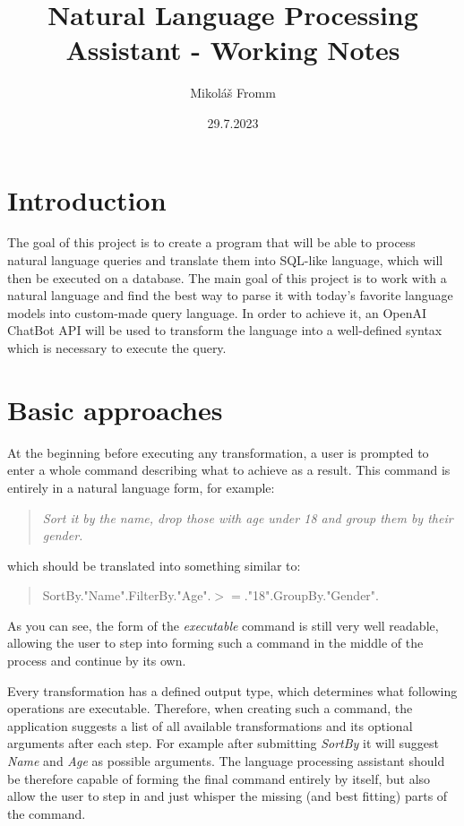 \documentclass[12pt]{article}
\title{Natural Language Processing Assistant - Working Notes}
\author{Mikoláš Fromm}
\date{29.7.2023}
\begin{document}
\maketitle

\section{Introduction}

The goal of this project is to create a program that will be able to process natural language queries and translate them into SQL-like language, which will then be executed on a database. The main goal of this project is to work with a natural language and find the best way to parse it with today's favorite language models into custom-made query language. In order to achieve it, an OpenAI ChatBot API will be used to transform the language into a well-defined syntax which is necessary to execute the query.


\section{Basic approaches}

At the beginning before executing any transformation, a user is prompted to enter a whole command describing what to achieve as a result. This command is entirely in a natural language form, for example: \begin{quotation}\textit{Sort it by the name, drop those with age under 18 and group them by their gender.}\end{quotation} which should be translated into something similar to: \begin{quotation}SortBy."Name".FilterBy."Age".\begin{math}>=\end{math}."18".GroupBy."Gender".\end{quotation}

As you can see, the form of the \textit{executable} command is still very well readable, allowing the user to step into forming such a command in the middle of the process and continue by its own. 

Every transformation has a defined output type, which determines what following operations are executable. Therefore, when creating such a command, the application suggests a list of all available transformations and its optional arguments after each step. For example after submitting \textit{SortBy} it will suggest \textit{Name} and \textit{Age} as possible arguments.
The language processing assistant should be therefore capable of forming the final command entirely by itself, but also allow the user to step in and just whisper the missing (and best fitting) parts of the command.
\end{document}
